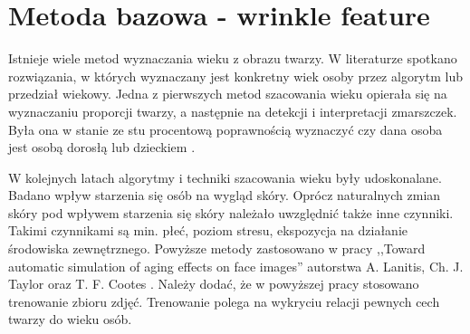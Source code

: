 \documentclass[a4paper,twoside,12pt]{book}
\begin{document}

    \chapter{Metoda bazowa - wrinkle feature}
    Istnieje wiele metod wyznaczania wieku z obrazu twarzy.
    W literaturze spotkano rozwiązania, w których wyznaczany
    jest konkretny
    wiek osoby przez algorytm lub przedział wiekowy.
    Jedna z pierwszych metod szacowania wieku opierała się na wyznaczaniu proporcji twarzy, a następnie na detekcji i
    interpretacji zmarszczek.
    Była ona w stanie ze stu procentową poprawnością wyznaczyć czy dana osoba jest osobą
    dorosłą lub
    dzieckiem \cite{kwonLobo}.

    W kolejnych latach algorytmy i techniki szacowania wieku były udoskonalane.
    Badano wpływ starzenia się osób na
    wygląd skóry.
    Oprócz naturalnych zmian skóry pod wpływem starzenia się skóry należało uwzględnić także inne
    czynniki.
    Takimi czynnikami są min.
    płeć, poziom stresu, ekspozycja na działanie środowiska zewnętrznego.
    Powyższe metody zastosowano w pracy ,,Toward automatic simulation
    of aging effects on face images'' autorstwa A. Lanitis, Ch. J. Taylor oraz T. F. Cootes \cite{lanitisTaylor}.
    Należy dodać, że w powyższej pracy stosowano trenowanie zbioru zdjęć.
    Trenowanie polega na wykryciu relacji pewnych cech twarzy do wieku osób.
\end{document}
